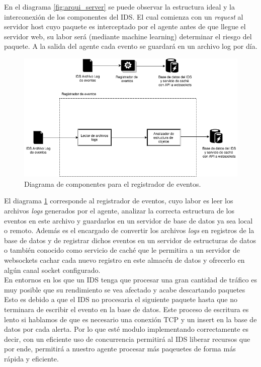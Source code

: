 En el diagrama \ref{fig:arqui_server} se puede observar la estructura ideal y la interconexión de los componentes del IDS. El cual comienza con un \textit{request} al servidor host cuyo paquete es interceptado por el agente antes de que llegue el servidor web, su labor será (mediante machine learning) determinar el riesgo del paquete. A la salida del agente cada evento se guardará en un archivo log por día. \\

\begin{figure}
	\centering
	\includegraphics[scale=.6]{images/Worker}
	\caption{Diagrama de componentes para el registrador de eventos.}
	\label{fig:ids_worker}
\end{figure}

El diagrama \ref{fig:ids_worker} corresponde al registrador de eventos, cuyo labor es leer los archivos \textit{logs} generados por el agente, analizar la correcta estructura de los eventos en este archivo y guardarlos en un servidor de base de datos ya sea local o remoto. Además es el encargado de convertir los archivos \textit{logs} en registros de la base de datos y de registrar dichos eventos en un servidor de estructuras de datos o también conocido como servicio de caché que le permitira a un servidor de websockets cachar cada nuevo registro en este almacén de datos y ofrecerlo en algún canal socket configurado. \\

En entornos en los que un IDS tenga que procesar una gran cantidad de tráfico es muy posible que su rendimiento se vea afectado y acabe descartando paquetes Esto es debido a que el IDS no procesaria el siguiente paquete hasta que no terminara de escribir el evento en la base de datos. Este proceso de escritura es lento si hablamos de que es necesario una conexión TCP y un insert en la base de datos por cada alerta. Por lo que esté modulo implementando correctamente es decir, con un eficiente uso de concurrencia permitirá al IDS liberar recursos que por ende, permitirá a nuestro agente procesar más paqeuetes de forma más rápida y eficiente. \\

